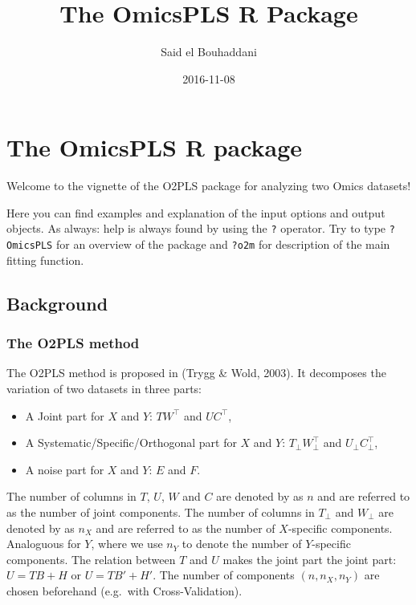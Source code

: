 \documentclass[]{article}
\title{The OmicsPLS R Package}
\author{Said el Bouhaddani}
\date{2016-11-08}
\providecommand{\tightlist}{%
  \setlength{\itemsep}{0pt}\setlength{\parskip}{0pt}}
\begin{document}
\maketitle

\section{The OmicsPLS R package}\label{the-omicspls-r-package}

Welcome to the vignette of the O2PLS package for analyzing two Omics
datasets!

Here you can find examples and explanation of the input options and
output objects. As always: help is always found by using the \texttt{?}
operator. Try to type \texttt{?OmicsPLS} for an overview of the package
and \texttt{?o2m} for description of the main fitting function.

\subsection{Background}\label{background}

\subsubsection{The O2PLS method}\label{the-o2pls-method}

The O2PLS method is proposed in (Trygg \& Wold, 2003). It decomposes the
variation of two datasets in three parts:

\begin{itemize}
\tightlist
\item
  A Joint part for \(X\) and \(Y\): \(TW^\top\) and \(UC^\top\),
\item
  A Systematic/Specific/Orthogonal part for \(X\) and \(Y\):
  \(T_\perp W_\perp^\top\) and \(U_\perp C_\perp^\top\),
\item
  A noise part for \(X\) and \(Y\): \(E\) and \(F\).
\end{itemize}

The number of columns in \(T\), \(U\), \(W\) and \(C\) are denoted by as
\(n\) and are referred to as the number of joint components. The number
of columns in \(T_\perp\) and \(W_\perp\) are denoted by as \(n_X\) and
are referred to as the number of \(X\)-specific components. Analoguous
for \(Y\), where we use \(n_Y\) to denote the number of \(Y\)-specific
components. The relation between \(T\) and \(U\) makes the joint part
the joint part: \(U = TB + H\) or \(U = TB'+ H'\). The number of
components \((n, n_X, n_Y)\) are chosen beforehand (e.g.~with
Cross-Validation).
\end{document}

